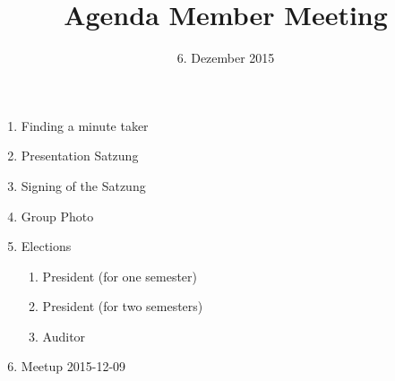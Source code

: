 \documentclass{article}
\title{Agenda Member Meeting}
\date{6. Dezember 2015}
\begin{document}
\large
\maketitle

\thispagestyle{empty}
\begin{enumerate}
\setlength\itemsep{1.5cm}
	\item Finding a minute taker
	\item Presentation Satzung
	\item Signing of the Satzung
	\item Group Photo
	\item Elections
	\begin{enumerate}
	\setlength\itemsep{1cm}
		\item President (for one semester)
		\item President (for two semesters)
		\item Auditor
	\end{enumerate}
	\item Meetup 2015-12-09
\end{enumerate}
\end{document}
